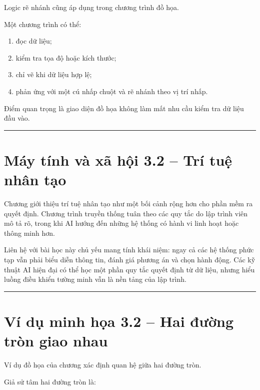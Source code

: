 \documentclass[
  11pt,
  a4paper,
]{article}
\providecommand{\tightlist}{%
  \setlength{\itemsep}{0pt}\setlength{\parskip}{0pt}}
\begin{document}
Logic rẽ nhánh cũng áp dụng trong chương trình đồ họa.

Một chương trình có thể:

\begin{enumerate}
\def\labelenumi{\arabic{enumi}.}
\tightlist
\item
  đọc dữ liệu;
\item
  kiểm tra tọa độ hoặc kích thước;
\item
  chỉ vẽ khi dữ liệu hợp lệ;
\item
  phản ứng với một cú nhấp chuột và rẽ nhánh theo vị trí nhấp.
\end{enumerate}

Điểm quan trọng là giao diện đồ họa không làm mất nhu cầu kiểm tra dữ
liệu đầu vào.

\begin{center}\rule{0.5\linewidth}{0.5pt}\end{center}

\section{Máy tính và xã hội 3.2 -- Trí tuệ nhân
tạo}\label{muxe1y-tuxednh-vuxe0-xuxe3-hux1ed9i-3.2-truxed-tuux1ec7-nhuxe2n-tux1ea1o}

Chương giới thiệu trí tuệ nhân tạo như một bối cảnh rộng hơn cho phần
mềm ra quyết định. Chương trình truyền thống tuân theo các quy tắc do
lập trình viên mô tả rõ, trong khi AI hướng đến những hệ thống có hành
vi linh hoạt hoặc thông minh hơn.

Liên hệ với bài học này chủ yếu mang tính khái niệm: ngay cả các hệ
thống phức tạp vẫn phải biểu diễn thông tin, đánh giá phương án và chọn
hành động. Các kỹ thuật AI hiện đại có thể học một phần quy tắc quyết
định từ dữ liệu, nhưng hiểu luồng điều khiển tường minh vẫn là nền tảng
của lập trình.

\begin{center}\rule{0.5\linewidth}{0.5pt}\end{center}

\section{Ví dụ minh họa 3.2 -- Hai đường tròn giao
nhau}\label{vuxed-dux1ee5-minh-hux1ecda-3.2-hai-ux111ux1b0ux1eddng-truxf2n-giao-nhau}

Ví dụ đồ họa của chương xác định quan hệ giữa hai đường tròn.

Giả sử tâm hai đường tròn là:
\end{document}
